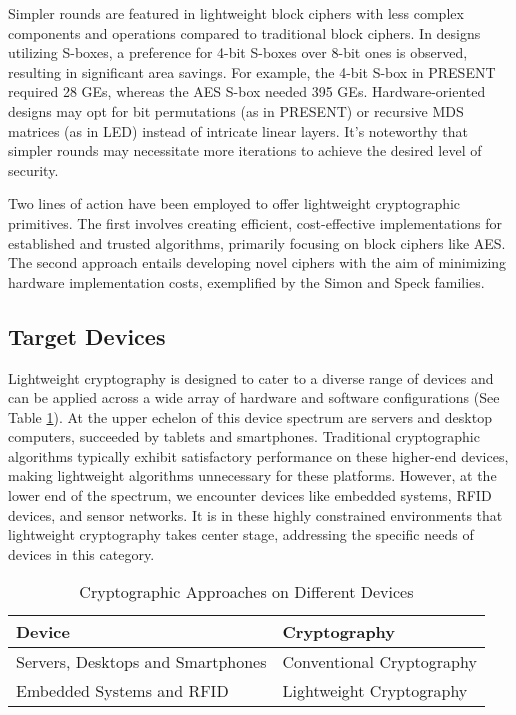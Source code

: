 \documentclass[conference,compsoc]{IEEEtran}
\begin{document}
Simpler rounds are featured in lightweight block ciphers with less complex components and operations compared to traditional block ciphers. In designs utilizing S-boxes, a preference for 4-bit S-boxes over 8-bit ones is observed, resulting in significant area savings. For example, the 4-bit S-box in PRESENT required 28 GEs, whereas the AES S-box needed 395 GEs. Hardware-oriented designs may opt for bit permutations (as in PRESENT) or recursive MDS matrices (as in LED\cite{LED}) instead of intricate linear layers. It's noteworthy that simpler rounds may necessitate more iterations to achieve the desired level of security.

Two lines of action have been employed to offer lightweight cryptographic primitives. The first involves creating efficient, cost-effective implementations for established and trusted algorithms, primarily focusing on block ciphers like AES. The second approach entails developing novel ciphers with the aim of minimizing hardware implementation costs, exemplified by the Simon and Speck families\cite{SIMONSPECK}.
\subsection{Target Devices}
Lightweight cryptography is designed to cater to a diverse range of devices and can be applied across a wide array of hardware and software configurations (See Table \ref{table:crypto_devices}). At the upper echelon of this device spectrum are servers and desktop computers, succeeded by tablets and smartphones. Traditional cryptographic algorithms typically exhibit satisfactory performance on these higher-end devices, making lightweight algorithms unnecessary for these platforms. However, at the lower end of the spectrum, we encounter devices like embedded systems, RFID devices, and sensor networks. It is in these highly constrained environments that lightweight cryptography takes center stage, addressing the specific needs of devices in this category\cite{NIST}.

\begin{table}[ht]
    \centering
    \caption{Cryptographic Approaches on Different Devices}
    \begin{tabular}{ll}
        \toprule
        \textbf{Device} & \textbf{Cryptography} \\
        \midrule
        Servers, Desktops and Smartphones & Conventional Cryptography \\
        Embedded Systems and RFID & Lightweight Cryptography \\
        \bottomrule
    \end{tabular}
    \label{table:crypto_devices}
\end{table}
\end{document}
